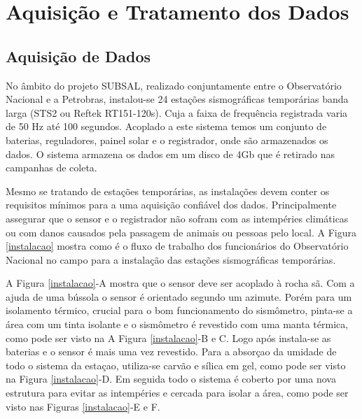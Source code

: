 \chapter{Aquisição e Tratamento dos Dados}	

\section{Aquisição de Dados}

No âmbito do projeto SUBSAL, realizado conjuntamente entre o Observatório Nacional e a Petrobras,  instalou-se 24 estações sismográficas temporárias banda larga (STS2 ou Reftek RT151-120s). Cuja a faixa de frequência registrada varia de 50 Hz até 100 segundos. Acoplado a este sistema temos um conjunto de baterias, reguladores, painel solar e o registrador, onde são armazenados os dados. O sistema armazena os dados em um disco de 4Gb que é retirado nas campanhas de coleta.

Mesmo se tratando de estações temporárias, as instalações devem conter os requisitos mínimos para a uma aquisição confiável dos dados. Principalmente assegurar que o sensor e o registrador não sofram com as intempéries climáticas ou com danos causados pela passagem de animais ou pessoas pelo local. A Figura \ref{instalacao} mostra como é o fluxo de trabalho dos funcionários do Observatório Nacional no campo para a instalação das estações sismográficas temporárias. 

A Figura \ref{instalacao}-A mostra que o sensor deve ser acoplado à rocha sã. Com a ajuda de uma bússola o sensor é orientado segundo um azimute.  Porém para um isolamento térmico, crucial para o bom funcionamento do sismômetro, pinta-se a área com um tinta isolante e o sismômetro é revestido com uma manta térmica, como pode ser visto na A Figura \ref{instalacao}-B e C. Logo após instala-se as baterias e o sensor é mais uma vez revestido. Para a absorçao da umidade de todo o sistema da estaçao, utiliza-se carvão e sílica em gel, como pode ser visto na Figura \ref{instalacao}-D. Em seguida todo o sistema é coberto por uma nova estrutura para evitar as intempéries e cercada para isolar a área, como pode ser visto nas Figuras \ref{instalacao}-E e F.	  

